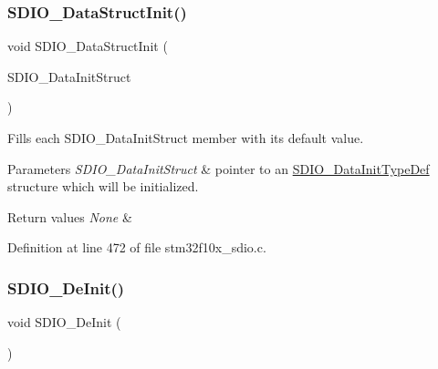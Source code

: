 \subsubsection{\texorpdfstring{S\+D\+I\+O\+\_\+\+Data\+Struct\+Init()}{SDIO\_DataStructInit()}}
{\footnotesize\ttfamily void S\+D\+I\+O\+\_\+\+Data\+Struct\+Init (\begin{DoxyParamCaption}\item[{\hyperlink{struct_s_d_i_o___data_init_type_def}{S\+D\+I\+O\+\_\+\+Data\+Init\+Type\+Def} $\ast$}]{S\+D\+I\+O\+\_\+\+Data\+Init\+Struct }\end{DoxyParamCaption})}



Fills each S\+D\+I\+O\+\_\+\+Data\+Init\+Struct member with its default value. 


\begin{DoxyParams}{Parameters}
{\em S\+D\+I\+O\+\_\+\+Data\+Init\+Struct} & pointer to an \hyperlink{struct_s_d_i_o___data_init_type_def}{S\+D\+I\+O\+\_\+\+Data\+Init\+Type\+Def} structure which will be initialized. \\
\hline
\end{DoxyParams}

\begin{DoxyRetVals}{Return values}
{\em None} & \\
\hline
\end{DoxyRetVals}


Definition at line 472 of file stm32f10x\+\_\+sdio.\+c.

\mbox{\label{group___s_d_i_o___private___functions_gac359d2c6c67a2590f8f9b720c0e4ff1b}} 
\subsubsection{\texorpdfstring{S\+D\+I\+O\+\_\+\+De\+Init()}{SDIO\_DeInit()}}
{\footnotesize\ttfamily void S\+D\+I\+O\+\_\+\+De\+Init (\begin{DoxyParamCaption}\item[{void}]{ }\end{DoxyParamCaption})}



